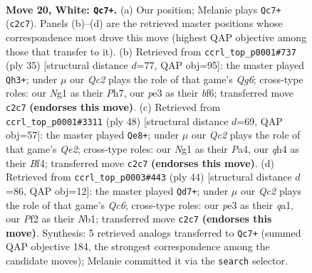 \documentclass[11pt]{article}
\begin{document}
\clearpage

\begin{figure}[p]\centering
\begin{subfigure}{0.46\textwidth}\centering
\resizebox{\linewidth}{!}{%
\newchessgame
\chessboard[
  setfen={rn5r/6k1/5p2/pB1p3p/3P3q/4p3/PPQ2PP1/1R2K1N1 w - - 0 20},
  showmover=false,
  pgfstyle=straightmove, color=movearrow, markmove={c2-c7}
]}
\caption{}
\end{subfigure}\hfill
\begin{subfigure}{0.46\textwidth}\centering
\resizebox{\linewidth}{!}{%
\newchessgame
\chessboard[
  setfen={r3kb2/1pQ2p1p/p4B2/4p3/4P3/2P3q1/PP6/RN3R1K b q - 1 18},
  showmover=false,
  pgfstyle=straightmove, color=movearrow, markmove={g3-h3}
]}
\caption{}
\end{subfigure}
\\[4pt]
\begin{subfigure}{0.46\textwidth}\centering
\resizebox{\linewidth}{!}{%
\newchessgame
\chessboard[
  setfen={rn4k1/1p3p2/p2p2p1/3P4/P2p1BPp/7q/4Q2P/4K2R w K - 0 25},
  showmover=false,
  pgfstyle=straightmove, color=movearrow, markmove={e2-e8}
]}
\caption{}
\end{subfigure}\hfill
\begin{subfigure}{0.46\textwidth}\centering
\resizebox{\linewidth}{!}{%
\newchessgame
\chessboard[
  setfen={r6r/p4kpp/bpQ5/8/2P5/6P1/P4P1P/qN2KB1R w K - 1 23},
  showmover=false,
  pgfstyle=straightmove, color=movearrow, markmove={c6-d7}
]}
\caption{}
\end{subfigure}
\caption{\textbf{Move 20, White: \texttt{Qc7+}.} (a) Our position; Melanie plays \texttt{Qc7+} (\texttt{c2c7}). Panels (b)--(d) are the retrieved master positions whose correspondence most drove this move (highest QAP objective among those that transfer to it). (b) Retrieved from \texttt{ccrl\_top\_p0001\#737} (ply 35) [structural distance $d$=77, QAP obj=95]: the master played \texttt{Qh3+}; under $\mu$ our \emph{Qc2} plays the role of that game's \emph{Qg6}; cross-type roles: our \emph{N}g1 as their \emph{P}h7, our \emph{p}e3 as their \emph{b}f6; transferred move \texttt{c2c7} \textbf{(endorses this move)}. (c) Retrieved from \texttt{ccrl\_top\_p0001\#3311} (ply 48) [structural distance $d$=69, QAP obj=57]: the master played \texttt{Qe8+}; under $\mu$ our \emph{Qc2} plays the role of that game's \emph{Qe2}; cross-type roles: our \emph{N}g1 as their \emph{P}a4, our \emph{q}h4 as their \emph{B}f4; transferred move \texttt{c2c7} \textbf{(endorses this move)}. (d) Retrieved from \texttt{ccrl\_top\_p0003\#443} (ply 44) [structural distance $d$=86, QAP obj=12]: the master played \texttt{Qd7+}; under $\mu$ our \emph{Qc2} plays the role of that game's \emph{Qc6}; cross-type roles: our \emph{p}e3 as their \emph{q}a1, our \emph{P}f2 as their \emph{N}b1; transferred move \texttt{c2c7} \textbf{(endorses this move)}. Synthesis: 5 retrieved analogs transferred to \texttt{Qc7+} (summed QAP objective 184, the strongest correspondence among the candidate moves); Melanie committed it via the \texttt{search} selector.}
\label{fig:thought-m38}
\end{figure}
\end{document}
